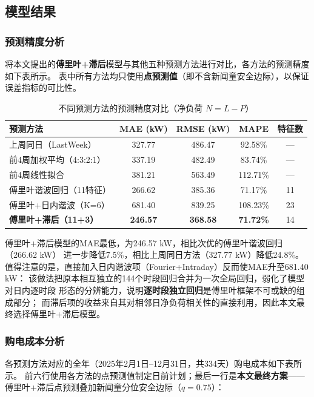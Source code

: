 \documentclass[12pt,a4paper]{article}
\begin{document}
\subsection{模型结果}

\subsubsection{预测精度分析}

将本文提出的\textbf{傅里叶+滞后}模型与其他五种预测方法进行对比，各方法的预测精度如下表所示。
表中所有方法均只使用\textbf{点预测值}（即不含新闻童安全边际），以保证误差指标的可比性。

\begin{table}[htbp]
\centering
\caption{不同预测方法的预测精度对比（净负荷 $N=L-P$）}
\begin{tabular}{lcccc}
\toprule
\textbf{预测方法} & \textbf{MAE (kW)} & \textbf{RMSE (kW)} & \textbf{MAPE} & \textbf{特征数} \\
\midrule
上周同日（LastWeek）            & 327.77 & 486.47 & 92.58\%  & --- \\
前4周加权平均（4:3:2:1）        & 337.19 & 482.49 & 83.74\%  & --- \\
前4周线性拟合                   & 381.21 & 563.49 & 112.71\% & --- \\
傅里叶谐波回归（11特征）        & 266.62 & 385.36 & 71.17\%  & 11 \\
傅里叶+日内谐波（K=6）          & 681.40 & 839.25 & 108.23\% & 23 \\
\textbf{傅里叶+滞后（11+3）}    & \textbf{246.57} & \textbf{368.58} & \textbf{71.72\%} & 14 \\
\bottomrule
\end{tabular}
\end{table}

傅里叶+滞后模型的MAE最低，为246.57 kW，相比次优的傅里叶谐波回归（266.62 kW）
进一步降低7.5\%，相比上周同日方法（327.77 kW）降低24.8\%。
值得注意的是，直接加入日内谐波项（Fourier+Intraday）反而使MAE升至681.40 kW：
该做法把原本相互独立的144个时段回归合并为一次全局回归，弱化了模型对日内逐时段
形态的分辨能力，说明\textbf{逐时段独立回归}是傅里叶框架不可或缺的组成部分；
而滞后项的收益来自其对相邻日净负荷相关性的直接利用，因此本文最终选择傅里叶+滞后模型。

\subsubsection{购电成本分析}

各预测方法对应的全年（2025年2月1日--12月31日，共334天）购电成本如下表所示。
前六行使用各方法的点预测值制定日前计划；最后一行是\textbf{本文最终方案}——
傅里叶+滞后点预测叠加新闻童分位安全边际（$q=0.75$）：
\end{document}
